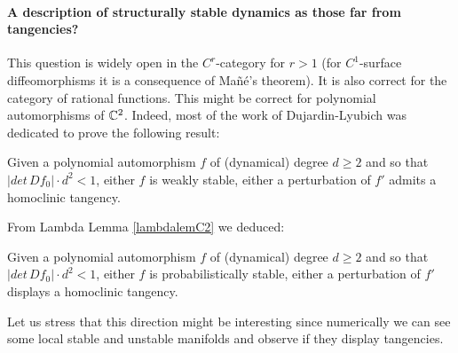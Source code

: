 \documentclass[11pt,openany,leqno]{article}
\begin{document}
 \paragraph{A description of structurally stable dynamics as those far from tangencies?}
This question is widely open in the $C^r$-category for $r>1$ (for $C^1$-surface diffeomorphisms it is a consequence of Ma\~n\'e's theorem). It is also correct for the category of rational functions. 
This might be correct for polynomial automorphisms of $\mathbb C^2$.  Indeed, most of the work of Dujardin-Lyubich was dedicated to prove the following result:
\begin{thm}
Given a polynomial automorphism $f$ of (dynamical) degree $d\ge 2$ and so that $ |det\, Df_0|\cdot d^2<1$, either $f$ is weakly stable, either a perturbation of $f'$ admits a homoclinic tangency. 
 \end{thm}
From Lambda Lemma \ref{lambdalemC2} we deduced:
\begin{cor}
Given a polynomial automorphism $f$ of (dynamical) degree $d\ge 2$ and so that $ |det\, Df_0|\cdot d^2<1$, either $f$ is probabilistically stable, either a perturbation of $f'$ displays a homoclinic tangency. 
 \end{cor}
 
Let us stress that this direction might be interesting since numerically we can  see some local stable and unstable manifolds and observe if they display tangencies. 





%
%
%
\end{document}
